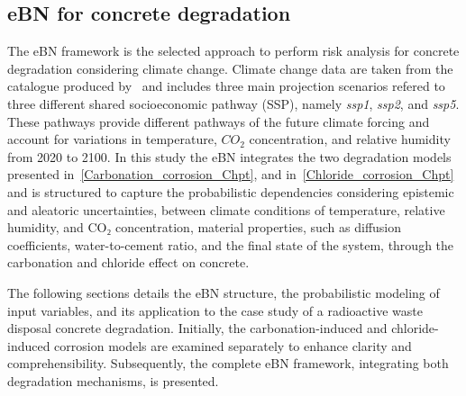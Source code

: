 \subsection{eBN for concrete degradation}
The eBN framework is the selected approach to perform risk analysis for concrete degradation considering climate change. Climate change data are taken from the catalogue produced by~\textcite{Copernicus_Climate_Change} and includes three main projection scenarios refered to three different shared socioeconomic pathway (SSP), namely \textit{ssp1}, \textit{ssp2}, and \textit{ssp5}. These pathways provide different pathways of the future climate forcing and account for variations in temperature, $CO_2$ concentration, and relative humidity from 2020 to 2100. 
In this study the eBN integrates the two degradation models presented in~\ref{Carbonation_corrosion_Chpt}, and in~\ref{Chloride_corrosion_Chpt} and is structured to capture the probabilistic dependencies considering epistemic and aleatoric uncertainties, between climate conditions of temperature, relative humidity, and CO₂ concentration, material properties, such as diffusion coefficients, water-to-cement ratio, and the final state of the system, through the carbonation and chloride effect on concrete.

The following sections details the eBN structure, the probabilistic modeling of input variables, and its application to the case study of a radioactive waste disposal concrete degradation. Initially, the carbonation-induced and chloride-induced corrosion models are examined separately to enhance clarity and comprehensibility. Subsequently, the complete eBN framework, integrating both degradation mechanisms, is presented.

